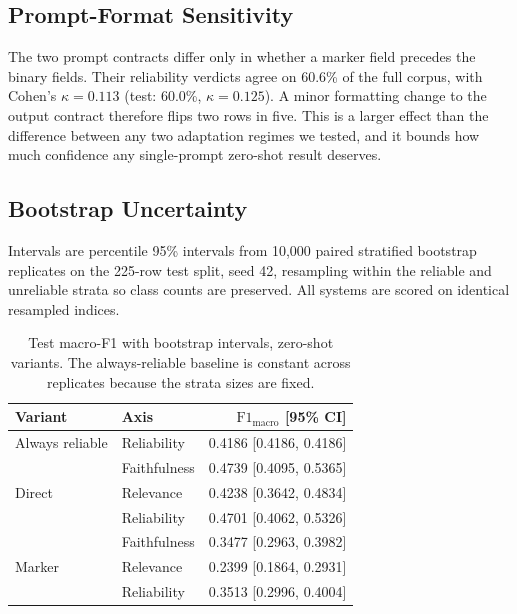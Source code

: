 \documentclass{zapiski}
\newcommand{\fmacro}{\mathrm{F1}_{\mathrm{macro}}}
\begin{document}
\subsection{Prompt-Format Sensitivity}
\label{sec:appendix-agreement}

The two prompt contracts differ only in whether a marker field precedes the
binary fields. Their reliability verdicts agree on 60.6\% of the full corpus,
with Cohen's $\kappa = 0.113$ (test: 60.0\%, $\kappa = 0.125$). A minor
formatting change to the output contract therefore flips two rows in five.
This is a larger effect than the difference between any two adaptation
regimes we tested, and it bounds how much confidence any single-prompt
zero-shot result deserves.

\subsection{Bootstrap Uncertainty}
\label{sec:appendix-bootstrap}

Intervals are percentile 95\% intervals from 10,000 paired stratified
bootstrap replicates on the 225-row test split, seed 42, resampling within the
reliable and unreliable strata so class counts are preserved. All systems are
scored on identical resampled indices.

\begin{table}[H]
\centering
\caption{Test macro-F1 with bootstrap intervals, zero-shot variants. The
always-reliable baseline is constant across replicates because the strata
sizes are fixed.}
\label{tab:bootstrap-point}
\begin{tabular}{llr}
\toprule
Variant & Axis & $\fmacro$ [95\% CI] \\
\midrule
Always reliable  & Reliability  & 0.4186 [0.4186, 0.4186] \\
\midrule
\multirow{3}{*}{Direct}
 & Faithfulness & 0.4739 [0.4095, 0.5365] \\
 & Relevance    & 0.4238 [0.3642, 0.4834] \\
 & Reliability  & 0.4701 [0.4062, 0.5326] \\
\midrule
\multirow{3}{*}{Marker}
 & Faithfulness & 0.3477 [0.2963, 0.3982] \\
 & Relevance    & 0.2399 [0.1864, 0.2931] \\
 & Reliability  & 0.3513 [0.2996, 0.4004] \\
\bottomrule
\end{tabular}
\end{table}
\end{document}

